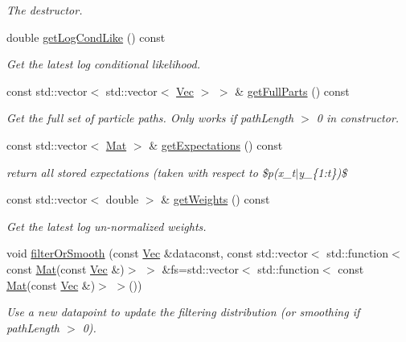 \begin{DoxyCompactItemize}
\begin{DoxyCompactList}\small\item\em The destructor. \end{DoxyCompactList}\item 
double \hyperlink{classAPFFilter_af9a5210f2927616dd6c82705d203b012}{get\+Log\+Cond\+Like} () const 
\begin{DoxyCompactList}\small\item\em Get the latest log conditional likelihood. \end{DoxyCompactList}\item 
const std\+::vector$<$ std\+::vector$<$ \hyperlink{pmfs_8h_a4c7df05c6f5e8a0d15ae14bcdbc07152}{Vec} $>$ $>$ \& \hyperlink{classAPFFilter_aa2ec5f04285cd1821f21ee85dcf50e3f}{get\+Full\+Parts} () const 
\begin{DoxyCompactList}\small\item\em Get the full set of particle paths. Only works if path\+Length $>$ 0 in constructor. \end{DoxyCompactList}\item 
const std\+::vector$<$ \hyperlink{pmfs_8h_ae601f56a556993079f730483c574356f}{Mat} $>$ \& \hyperlink{classAPFFilter_a84281845b2986f246fc132d13fd33e3d}{get\+Expectations} () const 
\begin{DoxyCompactList}\small\item\em return all stored expectations (taken with respect to \$p(x\+\_\+t$\vert$y\+\_\+\{1\+:t\})\$ \end{DoxyCompactList}\item 
const std\+::vector$<$ double $>$ \& \hyperlink{classAPFFilter_a5e552b59cc1e2adc56b06ea7925df51f}{get\+Weights} () const 
\begin{DoxyCompactList}\small\item\em Get the latest log un-\/normalized weights. \end{DoxyCompactList}\item 
void \hyperlink{classAPFFilter_adc7ee7fed78dd93309784378523e0399}{filter\+Or\+Smooth} (const \hyperlink{pmfs_8h_a4c7df05c6f5e8a0d15ae14bcdbc07152}{Vec} \&dataconst, const std\+::vector$<$ std\+::function$<$ const \hyperlink{pmfs_8h_ae601f56a556993079f730483c574356f}{Mat}(const \hyperlink{pmfs_8h_a4c7df05c6f5e8a0d15ae14bcdbc07152}{Vec} \&)$>$ $>$ \&fs=std\+::vector$<$ std\+::function$<$ const \hyperlink{pmfs_8h_ae601f56a556993079f730483c574356f}{Mat}(const \hyperlink{pmfs_8h_a4c7df05c6f5e8a0d15ae14bcdbc07152}{Vec} \&)$>$ $>$())
\begin{DoxyCompactList}\small\item\em Use a new datapoint to update the filtering distribution (or smoothing if path\+Length $>$ 0). \end{DoxyCompactList}\item 

\end{DoxyCompactItemize}
